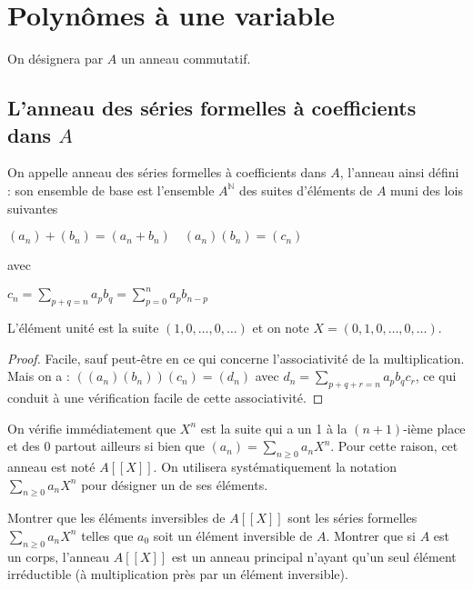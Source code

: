 

\section{Polynômes à une variable}

On désignera par $A$ un anneau commutatif.

\subsection{L'anneau des séries formelles à coefficients dans $A$}

\begin{de}
On appelle anneau des séries formelles à coefficients dans $A$, l'anneau ainsi défini : son ensemble de base est l'ensemble $A^\mathbb{N}$ des suites d'éléments de $A$ muni des lois suivantes

$(a_n) + (b_n) = (a_n + b_n) \quad (a_n)(b_n) = (c_n)$

avec

$c_n = \sum_{p+q=n} a_p b_q = \sum_{p=0}^n a_p b_{n-p}$

L'élément unité est la suite $(1,0,\ldots,0,\ldots)$ et on note $X = (0,1,0,\ldots,0,\ldots)$.
\end{de}

\begin{proof}
Facile, sauf peut-être en ce qui concerne l'associativité de la multiplication. Mais on a : $((a_n)(b_n))(c_n) = (d_n)$ avec $d_n = \sum_{p+q+r=n} a_p b_q c_r$, ce qui conduit à une vérification facile de cette associativité.
\end{proof}

\begin{rem}
On vérifie immédiatement que $X^n$ est la suite qui a un 1 à la $(n + 1)$-ième place et des 0 partout ailleurs si bien que $(a_n) = \sum_{n \geq 0} a_n X^n$. Pour cette raison, cet anneau est noté $A[[X]]$. On utilisera systématiquement la notation $\sum_{n \geq 0} a_n X^n$ pour désigner un de ses éléments.
\end{rem}

\begin{ex}
Montrer que les éléments inversibles de $A[[X]]$ sont les séries formelles $\sum_{n \geq 0} a_n X^n$ telles que $a_0$ soit un élément inversible de $A$. Montrer que si $A$ est un corps, l'anneau $A[[X]]$ est un anneau principal n'ayant qu'un seul élément irréductible (à multiplication près par un élément inversible).
\end{ex}

